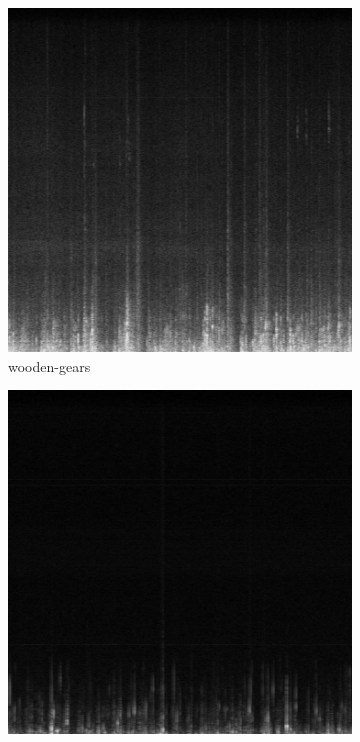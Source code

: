 \documentclass[a4paper,10pt,final]{ThesisStyle}
\begin{document}
\begin{figure}
        \centering
        \begin{subfigure}[b]{0.25\textwidth}
                \centering
                \includegraphics[width=\textwidth]{images/wooden-gears.pdf}
                \caption{wooden-gears}
        \end{subfigure}%
        \begin{subfigure}[b]{0.25\textwidth}
                \centering
                \includegraphics[width=\textwidth]{images/bubbles.pdf}

\end{subfigure}
\end{figure}
\end{document}
